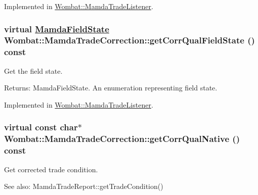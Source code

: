 Implemented in \hyperlink{classWombat_1_1MamdaTradeListener_cbb0d0f341ddad192a5c83ce148cea9f}{Wombat::Mamda\-Trade\-Listener}.\hypertarget{classWombat_1_1MamdaTradeCorrection_984b2d9f15a3676c9e1aa37972a6f53d}{
\subsubsection[getCorrQualFieldState]{\setlength{\rightskip}{0pt plus 5cm}virtual \hyperlink{namespaceWombat_93aac974f2ab713554fd12a1fa3b7d2a}{Mamda\-Field\-State} Wombat::Mamda\-Trade\-Correction::get\-Corr\-Qual\-Field\-State () const}}
\label{classWombat_1_1MamdaTradeCorrection_984b2d9f15a3676c9e1aa37972a6f53d}


Get the field state. 

\begin{Desc}
\item[Returns:]Mamda\-Field\-State. An enumeration representing field state. \end{Desc}


Implemented in \hyperlink{classWombat_1_1MamdaTradeListener_daad2759f93458592e1c984b983443bd}{Wombat::Mamda\-Trade\-Listener}.\hypertarget{classWombat_1_1MamdaTradeCorrection_9506794767b00b9609a232b2bc3328f0}{
\subsubsection[getCorrQualNative]{\setlength{\rightskip}{0pt plus 5cm}virtual const char$\ast$ Wombat::Mamda\-Trade\-Correction::get\-Corr\-Qual\-Native () const}}
\label{classWombat_1_1MamdaTradeCorrection_9506794767b00b9609a232b2bc3328f0}


Get corrected trade condition. 

\begin{Desc}
\item[See also:]Mamda\-Trade\-Report::get\-Trade\-Condition() \end{Desc}


